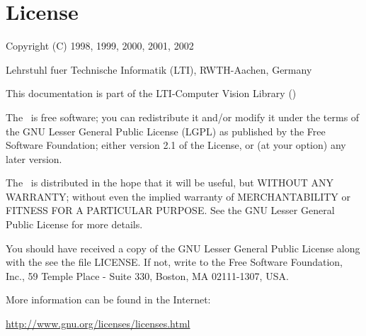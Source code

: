 \chapter*{License}

Copyright (C) 1998, 1999, 2000, 2001, 2002 

Lehrstuhl fuer Technische Informatik (LTI), RWTH-Aachen, Germany
 
This documentation is part of the LTI-Computer Vision Library (\ltilib)

The \ltilib\ is free software; you can redistribute it and/or modify it under
the terms of the GNU Lesser General Public License (LGPL) as published by the
Free Software Foundation; either version 2.1 of the License, or (at your
option) any later version.

The \ltilib\ is distributed in the hope that it will be useful, but WITHOUT
ANY WARRANTY; without even the implied warranty of MERCHANTABILITY or FITNESS
FOR A PARTICULAR PURPOSE.  See the GNU Lesser General Public License for more
details.

You should have received a copy of the GNU Lesser General Public License along
with the \ltilib\; see the file LICENSE.  If not, write to the Free Software
Foundation, Inc., 59 Temple Place - Suite 330, Boston, MA 02111-1307, USA.

More information can be found in the Internet:

\url{http://www.gnu.org/licenses/licenses.html}

